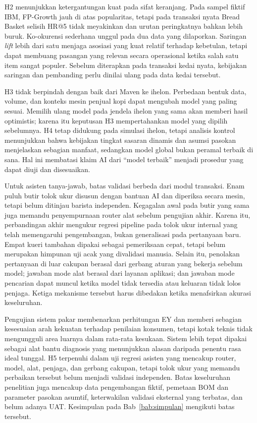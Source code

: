 H2 menunjukkan ketergantungan kuat pada sifat keranjang. Pada sampel fiktif IBM, FP-Growth jauh di atas popularitas, tetapi pada transaksi nyata Bread Basket selisih HR@5 tidak meyakinkan dan urutan peringkatnya bahkan lebih buruk. Ko-okurensi sederhana unggul pada dua data yang dilaporkan. Saringan \textit{lift} lebih dari satu menjaga asosiasi yang kuat relatif terhadap kebetulan, tetapi dapat membuang pasangan yang relevan secara operasional ketika salah satu item sangat populer. Sebelum diterapkan pada transaksi kedai nyata, kebijakan saringan dan pembanding perlu dinilai ulang pada data kedai tersebut.

H3 tidak berpindah dengan baik dari Maven ke ihelon. Perbedaan bentuk data, volume, dan konteks mesin penjual kopi dapat mengubah model yang paling sesuai. Memilih ulang model pada jendela ihelon yang sama akan memberi hasil optimistis; karena itu keputusan H3 mempertahankan model yang dipilih sebelumnya. H4 tetap didukung pada simulasi ihelon, tetapi analisis kontrol menunjukkan bahwa kebijakan tingkat sasaran dinamis dan asumsi pasokan menjelaskan sebagian manfaat, sedangkan model global bukan peramal terbaik di sana. Hal ini membatasi klaim AI dari ``model terbaik'' menjadi prosedur yang dapat diuji dan disesuaikan.

Untuk asisten tanya-jawab, batas validasi berbeda dari modul transaksi. Enam puluh butir tolok ukur disusun dengan bantuan AI dan diperiksa secara mesin, tetapi belum ditinjau barista independen. Kegagalan awal pada butir yang sama juga memandu penyempurnaan router alat sebelum pengujian akhir. Karena itu, perbandingan akhir mengukur regresi pipeline pada tolok ukur internal yang telah memengaruhi pengembangan, bukan generalisasi pada pertanyaan baru. Empat kueri tambahan dipakai sebagai pemeriksaan cepat, tetapi belum merupakan himpunan uji acak yang divalidasi manusia. Selain itu, penolakan pertanyaan di luar cakupan berasal dari gerbang aturan yang bekerja sebelum model; jawaban mode alat berasal dari layanan aplikasi; dan jawaban mode pencarian dapat muncul ketika model tidak tersedia atau keluaran tidak lolos penjaga. Ketiga mekanisme tersebut harus dibedakan ketika menafsirkan akurasi keseluruhan.

Pengujian sistem pakar membenarkan perhitungan EY dan memberi sebagian kesesuaian arah kekuatan terhadap penilaian konsumen, tetapi kotak teknis tidak mengungguli area luarnya dalam rata-rata kesukaan. Sistem lebih tepat dipakai sebagai alat bantu diagnosis yang menunjukkan alasan daripada penentu rasa ideal tunggal. H5 terpenuhi dalam uji regresi asisten yang mencakup router, model, alat, penjaga, dan gerbang cakupan, tetapi tolok ukur yang memandu perbaikan tersebut belum menjadi validasi independen. Batas keseluruhan penelitian juga mencakup data pengembangan fiktif, pemetaan BOM dan parameter pasokan asumtif, keterwakilan validasi eksternal yang terbatas, dan belum adanya UAT. Kesimpulan pada Bab~\ref{bab:simpulan} mengikuti batas tersebut.
